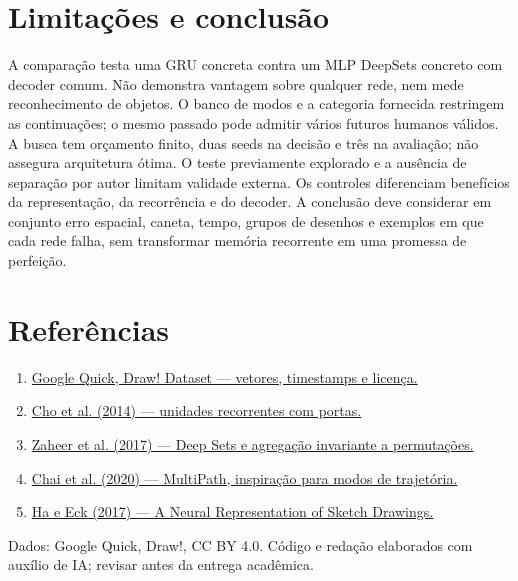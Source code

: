 \documentclass[11pt,a4paper]{article}
\begin{document}
\section{Limitações e conclusão}
A comparação testa uma GRU concreta contra um MLP DeepSets concreto com decoder comum. Não demonstra vantagem sobre qualquer rede, nem mede reconhecimento de objetos. O banco de modos e a categoria fornecida restringem as continuações; o mesmo passado pode admitir vários futuros humanos válidos. A busca tem orçamento finito, duas seeds na decisão e três na avaliação; não assegura arquitetura ótima. O teste previamente explorado e a ausência de separação por autor limitam validade externa. Os controles diferenciam benefícios da representação, da recorrência e do decoder. A conclusão deve considerar em conjunto erro espacial, caneta, tempo, grupos de desenhos e exemplos em que cada rede falha, sem transformar memória recorrente em uma promessa de perfeição.
\section*{Referências}\begin{enumerate}
\item \href{https://github.com/googlecreativelab/quickdraw-dataset}{Google Quick, Draw! Dataset — vetores, timestamps e licença.}
\item \href{https://arxiv.org/abs/1406.1078}{Cho et al. (2014) — unidades recorrentes com portas.}
\item \href{https://arxiv.org/abs/1703.06114}{Zaheer et al. (2017) — Deep Sets e agregação invariante a permutações.}
\item \href{https://proceedings.mlr.press/v100/chai20a.html}{Chai et al. (2020) — MultiPath, inspiração para modos de trajetória.}
\item \href{https://arxiv.org/abs/1704.03477}{Ha e Eck (2017) — A Neural Representation of Sketch Drawings.}
\end{enumerate}\small Dados: Google Quick, Draw!, CC BY 4.0. Código e redação elaborados com auxílio de IA; revisar antes da entrega acadêmica.
\end{document}

